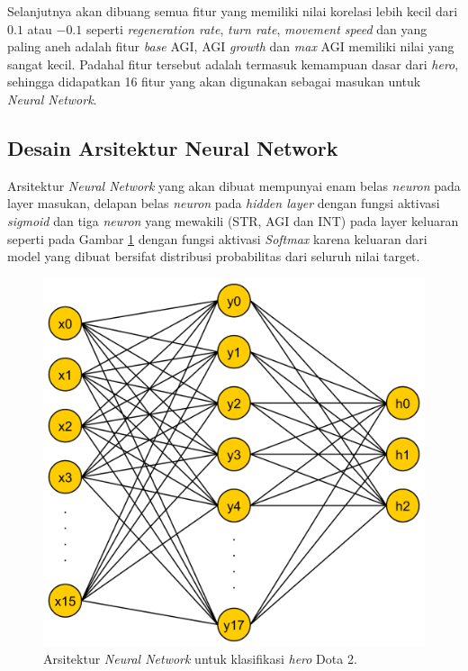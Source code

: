 Selanjutnya akan dibuang semua fitur yang memiliki nilai korelasi lebih kecil dari $0.1$ atau $-0.1$ seperti \textit{regeneration rate}, \textit{turn rate}, \textit{movement speed} dan yang paling aneh adalah fitur \textit{base} AGI, AGI \textit{growth} dan \textit{max} AGI memiliki nilai yang sangat kecil. Padahal fitur tersebut adalah termasuk kemampuan dasar dari \textit{hero}, sehingga didapatkan 16 fitur yang akan digunakan sebagai masukan untuk \textit{Neural Network}.
\vspace{1ex}

\subsection{Desain Arsitektur Neural Network}
\label{sec:sub_sec3_dota2_arch}
\vspace{1ex}

Arsitektur \textit{Neural Network} yang akan dibuat mempunyai enam belas \textit{neuron} pada layer masukan, delapan belas \textit{neuron} pada \textit{hidden layer} dengan fungsi aktivasi \textit{sigmoid} dan tiga \textit{neuron} yang mewakili (STR, AGI dan INT) pada layer keluaran seperti pada Gambar \ref{fig:nn_dota2} dengan fungsi aktivasi \textit{Softmax} karena keluaran dari model yang dibuat bersifat distribusi probabilitas dari seluruh nilai target. 
\vspace{1ex}

\begin{figure} [!h] \centering
	\includegraphics[scale=0.075]{img/nn_dota2.png}
	\caption{Arsitektur \textit{Neural Network} untuk klasifikasi \textit{hero} Dota 2.}
	\label{fig:nn_dota2}
\end{figure}

